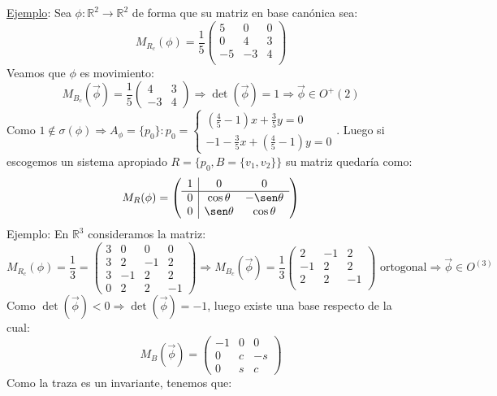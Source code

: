 \documentclass[10pt,a4paper,openright]{book}
\begin{document}
\underline{Ejemplo}:
Sea $\phi: \mathbb{R}^2 \to \mathbb{R}^2$ de forma que su matriz en base canónica sea:
$$M_{R_c} (\phi) = \frac{1}{5} \begin{pmatrix} 5 & 0 & 0 \\ 0 & 4 & 3 \\ -5 & -3 & 4 \\\end{pmatrix} $$
Veamos que $\phi$ es movimiento:
$$M_{B_c} (\vec{\phi}) = \frac{1}{5} \begin{pmatrix}
4 & 3 \\ -3 & 4
\end{pmatrix} \Rightarrow \det(\vec{\phi}) = 1 \Rightarrow \vec{\phi} \in O^+ (2)$$
Como $1 \notin \sigma(\phi) \Rightarrow A_\phi = \{p_0\} : p_0 = \begin{cases} (\frac{4}{5} - 1) x + \frac{3}{5} y = 0 \\ -1 - \frac{3}{5} x + (\frac{4}{5} - 1) y = 0\end{cases}$. Luego si escogemos un sistema apropiado $R = \{p_0, B = \{v_1, v_2\}\}$ su matriz quedaría como:
$$M_R (\phi) = \left(\begin{array}{c|cc}
1& 0  & 0 \\
\hline
0 & \cos\theta & -\sen\theta    \\
0 & \sen\theta & \cos\theta 
\end{array}
\right)$$
Ejemplo: En $\mathbb{R}^3$ consideramos la matriz:
$$M_{R_c} (\phi) = \frac{1}{3} =
\left(\begin{array}{c|ccc}
3 & 0  & 0 & 0 \\
\hline
3 & 2 & -1 & 2    \\
3 & -1 & 2 & 2 \\
0 & 2 & 2 & -1 
\end{array}
\right) \Rightarrow M_{B_c} (\vec{\phi}) = \frac{1}{3} \begin{pmatrix} 2 & -1 & 2 \\ -1 & 2 & 2 \\ 2 & 2 & -1 \\\end{pmatrix} \mbox{ ortogonal}\Rightarrow \vec{\phi} \in O^(3)$$
Como $\det (\vec{\phi}) < 0 \Rightarrow \det(\vec{\phi}) = -1$, luego existe una base respecto de la cual:
$$M_B(\vec{\phi})=\begin{pmatrix} -1 & 0 & 0 \\ 0 & c & -s \\ 0 & s & c\end{pmatrix}$$
Como la traza es un invariante, tenemos que:
\end{document}
